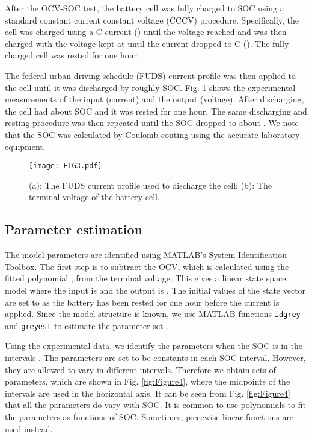 \documentclass[letterpaper,twocolumn]{IEEEtran}
\begin{document}
After the OCV-SOC test, the battery cell was fully charged to  SOC using a standard constant current constant voltage (CCCV) procedure. Specifically, the cell was charged using a C current () until the voltage reached  and was then charged with the voltage kept at  until the current dropped to C (). The fully charged cell was rested for one hour.

The federal urban driving schedule (FUDS) current profile \cite{testmanual} was then applied to the cell until it was discharged by roughly  SOC. Fig. \ref{fig:Figure3} shows the experimental measurements of the input (current) and the output (voltage). After discharging, the cell had about  SOC and it was rested for one hour. The same discharging and resting procedure was then repeated until the SOC dropped to about .  We note that the SOC was calculated by Coulomb couting using the accurate laboratory equipment.

\begin{figure}
\centering
\texttt{[image: FIG3.pdf]}
\caption{(a): The FUDS current profile used to discharge the cell; (b): The terminal voltage of the battery cell.}
\label{fig:Figure3}
\end{figure}

\subsection{Parameter estimation}
The model parameters are identified using MATLAB\textsuperscript {\circledR}'s System Identification Toolbox. The first step is to subtract the OCV, which is calculated using the fitted polynomial , from the terminal voltage. This gives a linear state space model where the input is  and the output is . The initial values of the state vector  are set to  as the battery has been rested for one hour before the current is applied. Since the model structure is known, we use MATLAB functions \texttt{idgrey} and \texttt{greyest} to estimate the parameter set .

Using the experimental data, we identify the parameters when the SOC is in the intervals . The parameters are set to be constants in each SOC interval. However, they are allowed to vary in different intervals. Therefore we obtain  sets of parameters, which are shown in Fig. \ref{fig:Figure4}, where the midpoints of the intervals are used in the horizontal axis.
It can be seen from Fig. \ref{fig:Figure4} that all the parameters do vary with SOC. It is common to use polynomials to fit the parameters as functions of SOC. Sometimes, piecewise linear functions are used instead.
\end{document}
